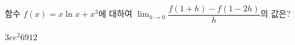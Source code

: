 함수 $f(x)=x\ln x+x^3$에 대하여 $\displaystyle\lim_{h\to 0}\dfrac{f(1+h)-f(1-2h)}{h}$의 값은?
\begin{choices32}{$3e$}{$e^2$}{$6$}{$9$}{$12$}\end{choices32}

